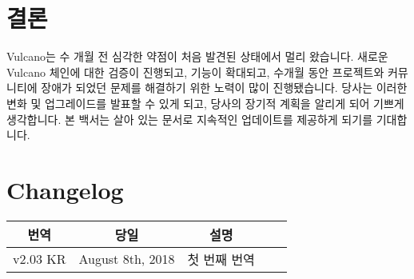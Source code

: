 \documentclass[A4paper, 12pt]{article}
\begin{document}
\section{결론}
Vulcano는 수 개월 전 심각한 약점이 처음 발견된 상태에서 멀리 왔습니다. 새로운 Vulcano 체인에 대한 검증이 진행되고, 기능이 확대되고, 수개월 동안 프로젝트와 커뮤니티에 장애가 되었던 문제를 해결하기 위한 노력이 많이 진행됐습니다. 당사는 이러한 변화 및 업그레이드를 발표할 수 있게 되고, 당사의 장기적 계획을 알리게 되어 기쁘게 생각합니다. 본 백서는 살아 있는 문서로 지속적인 업데이트를 제공하게 되기를 기대합니다.
\newpage
\section{Changelog}

\begin{table}[h]
\centering
\begin{tabular}{@{}ccccc@{}}
\toprule
번역 & 당일 & 설명 \\ \midrule
v2.03 KR & August 8th, 2018 & 첫 번째 번역 \\
 \bottomrule
\end{tabular}
\end{table}
\end{document}
